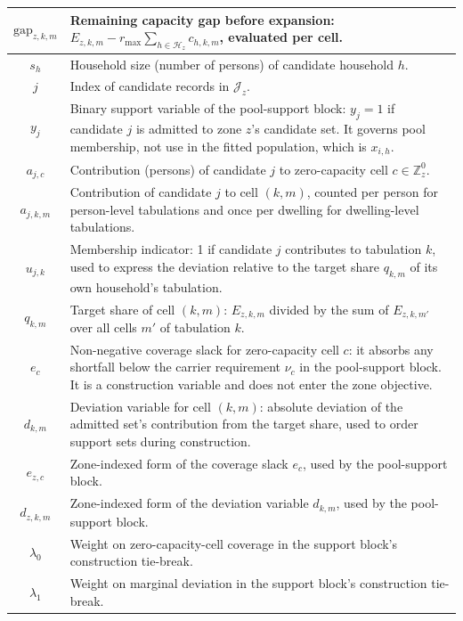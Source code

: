 \begin{longtable}{|c|p{10cm}|}
\( \mathrm{gap}_{z,k,m} \) & Remaining capacity gap before expansion: \( E_{z,k,m} - r_{\max}\sum_{h\in\mathcal{H}_z} c_{h,k,m} \), evaluated per cell. \\ \hline
\( s_h \) & Household size (number of persons) of candidate household \( h \). \\ \hline
\( j \) & Index of candidate records in \( \mathcal{J}_z \). \\ \hline
\( y_j \) & Binary support variable of the pool-support block: \( y_j=1 \) if candidate \( j \) is admitted to zone \( z \)'s candidate set. It governs pool membership, not use in the fitted population, which is \( x_{i,h} \). \\ \hline
\( a_{j,c} \) & Contribution (persons) of candidate \( j \) to zero-capacity cell \( c \in \mathbb{Z}^0_z \). \\ \hline
\( a_{j,k,m} \) & Contribution of candidate \( j \) to cell \( (k,m) \), counted per person for person-level tabulations and once per dwelling for dwelling-level tabulations. \\ \hline
\( u_{j,k} \) & Membership indicator: 1 if candidate \( j \) contributes to tabulation \( k \), used to express the deviation relative to the target share \( q_{k,m} \) of its own household's tabulation. \\ \hline
\( q_{k,m} \) & Target share of cell \( (k,m) \): \( E_{z,k,m} \) divided by the sum of \( E_{z,k,m'} \) over all cells \( m' \) of tabulation \( k \). \\ \hline
\( e_c \) & Non-negative coverage slack for zero-capacity cell \( c \): it absorbs any shortfall below the carrier requirement \( \nu_c \) in the pool-support block. It is a construction variable and does not enter the zone objective. \\ \hline
\( d_{k,m} \) & Deviation variable for cell \( (k,m) \): absolute deviation of the admitted set's contribution from the target share, used to order support sets during construction. \\ \hline
\( e_{z,c} \) & Zone-indexed form of the coverage slack \( e_c \), used by the pool-support block. \\ \hline
\( d_{z,k,m} \) & Zone-indexed form of the deviation variable \( d_{k,m} \), used by the pool-support block. \\ \hline
\( \lambda_0 \) & Weight on zero-capacity-cell coverage in the support block's construction tie-break. \\ \hline
\( \lambda_1 \) & Weight on marginal deviation in the support block's construction tie-break. \\ \hline

\end{longtable}
